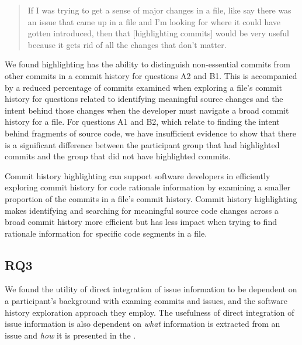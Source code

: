\begin{quote}
  If I was trying to get a sense of major changes in a file, like say there was an issue that came up in a file and I’m looking for where it could have gotten introduced, 
  then that [highlighting commits] would be very useful because it gets rid of all the changes that don’t matter. 
\end{quote}

We found highlighting has the ability to distinguish non-essential commits from other commits in a commit history
for questions A2 and B1.
This is accompanied by a reduced percentage of commits examined when exploring a file's commit history 
for questions related to identifying meaningful source changes 
and the intent behind those changes when the developer must navigate a broad commit history for a file. 
For questions A1 and B2, which relate to finding the intent behind fragments of source code,
we have insufficient evidence to show that there is a significant difference
between the participant group that had highlighted commits and the group that did not have highlighted commits.

\begin{summary}[RQ2]
  Commit history highlighting can support software developers in efficiently 
  exploring commit history for code rationale information 
  by examining a smaller proportion of the commits in a file's commit history.
  Commit history highlighting makes identifying and searching for meaningful source code changes 
  across a broad commit history more efficient but has less impact when trying to find rationale information for specific code segments in a file.
\end{summary}


\subsection{RQ3}
\label{subsec:RQ3}


We found the utility of direct integration of issue information 
to be dependent on a participant's background with examing commits and issues,
and the software history exploration approach they employ.
The usefulness of direct integration of issue information is also dependent on 
\emph{what} information is extracted from an issue and \emph{how} it is presented in the .

